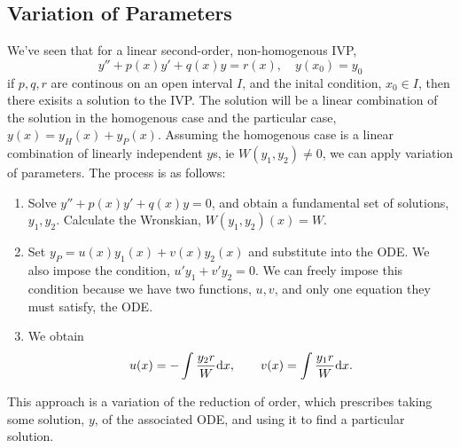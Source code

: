 \documentclass{report}
\begin{document}
\subsection{Variation of Parameters}
We've seen that for a linear second-order, non-homogenous IVP,
$$
  y'' + p(x)y' + q(x)y = r(x),\quad y(x_0)=y_0
$$
if $p,q,r$ are continous on an open interval $I$, and the inital condition, $x_0\in I$, then there exisits a solution to the IVP. The solution will be a linear combination of the solution in the homogenous case and the particular case, $y(x) = y_H(x) + y_P(x)$. Assuming the homogenous case is a linear combination of linearly independent $y$s, ie $W(y_1, y_2) \neq 0$, we can apply variation of parameters. The process is as follows:
\begin{enumerate}
  \item Solve $y'' + p(x)y' + q(x)y = 0$, and obtain a fundamental set of solutions, $y_1, y_2$. Calculate the Wronskian, $W(y_1,y_2)(x) = W$.
  \item Set $y_P = u(x)y_1(x) + v(x)y_2(x)$ and substitute into the ODE. We also impose the condition, $u'y_1 + v'y_2 = 0$. We can freely impose this condition because we have two functions, $u,v$, and only one equation they must satisfy, the ODE.
  \item We obtain
  $$
    u(x) = -\int \frac{y_2r}{W}\mathrm{d} x,\qquad v(x) = \int \frac{y_1r}{W}\mathrm{d} x.
  $$
\end{enumerate}
This approach is a variation of the reduction of order, which prescribes taking some solution, $y$, of the associated ODE, and using it to find a particular solution.
\end{document}
